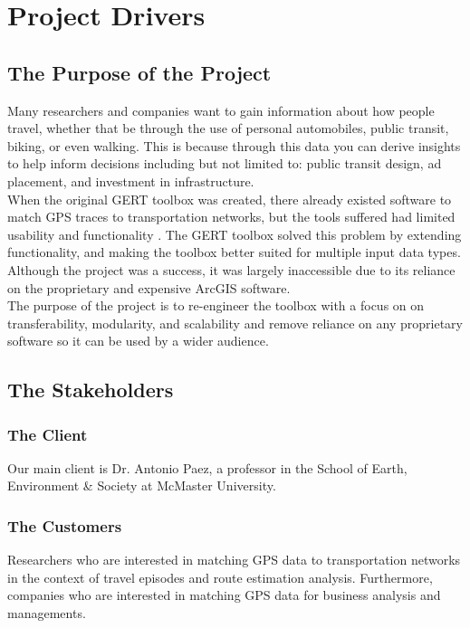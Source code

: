 \documentclass[12pt, titlepage]{article}
\begin{document}
\section{Project Drivers}

\subsection{The Purpose of the Project}
Many researchers and companies want to gain information about how people travel, whether that be through the use of personal automobiles, public transit, biking, or even walking. This is because through this data you can derive insights to help inform decisions including but not limited to: public transit design, ad placement, and investment in infrastructure. \\

\noindent When the original GERT toolbox was created, there already existed software to match GPS traces to transportation networks, but the tools suffered had limited usability and functionality \cite{GISBASED}. The GERT toolbox solved this problem by extending functionality, and making the toolbox better suited for multiple input data types. Although the project was a success, it was largely inaccessible due to its reliance on the proprietary and expensive ArcGIS software. \\

\noindent The purpose of the project is to re-engineer the toolbox with a focus on on transferability, modularity, and scalability and remove reliance on any proprietary software so it can be used by a wider audience. 

\subsection{The Stakeholders}
\subsubsection{The Client}
Our main client is Dr. Antonio Paez, a professor in the School of Earth, Environment & Society at McMaster University. 

\subsubsection{The Customers}
Researchers who are interested in matching GPS data to transportation networks in the context of travel episodes and route estimation analysis. Furthermore, companies who are interested in matching GPS data for business analysis and managements. 
\end{document}
